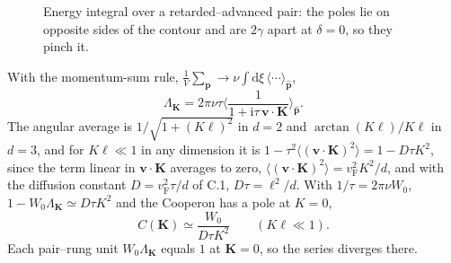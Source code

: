 \begin{figure}[ht]
\centering
{}
\caption{Energy integral over a retarded--advanced pair: the poles lie on opposite sides of the contour and are $2\gamma$ apart at $\delta=0$, so they pinch it.}
\label{fig:wl_poles}
\end{figure}

With the momentum-sum rule, $\frac1V\sum_{\mathbf p}\to\nu\int\mathrm{d}\xi\,\langle\cdots\rangle_{\hat{\mathbf p}}$,
\[
\Lambda_{\mathbf K}=2\pi\nu\tau\Big\langle\frac{1}{1+\mathrm{i}\tau\,\mathbf v\!\cdot\!\mathbf K}\Big\rangle_{\hat{\mathbf p}} .
\]
The angular average is $1/\sqrt{1+(K\ell)^2}$ in $d=2$ and $\arctan(K\ell)/K\ell$ in $d=3$, and for $K\ell\ll1$ in any dimension it is $1-\tau^2\langle(\mathbf v\!\cdot\!\mathbf K)^2\rangle=1-D\tau K^2$, since the term linear in $\mathbf v\!\cdot\!\mathbf K$ averages to zero, $\langle(\mathbf v\!\cdot\!\mathbf K)^2\rangle=v_{\mathrm F}^2K^2/d$, and with the diffusion constant $D=v_{\mathrm F}^2\tau/d$ of C.1, $D\tau=\ell^2/d$. With $1/\tau=2\pi\nu W_0$, $1-W_0\Lambda_{\mathbf K}\simeq D\tau K^2$ and the Cooperon has a pole at $K=0$,
\begin{equation}
    C(\mathbf K)\simeq\frac{W_0}{D\tau K^2}\qquad(K\ell\ll1).
    \label{eq:wl_pole}
\end{equation}
Each pair--rung unit $W_0\Lambda_{\mathbf K}$ equals $1$ at $\mathbf K=0$, so the series diverges there.

